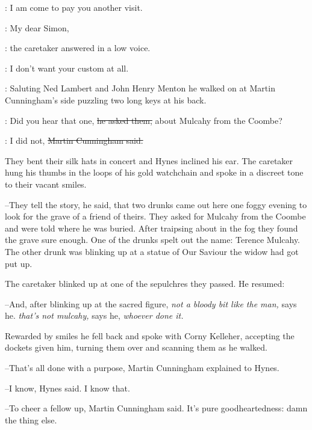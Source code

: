 \simon:
I am come to pay you another visit.

\oconnell:
My dear Simon,

:
the caretaker answered in a low voice.

\oconnell:
I don't want your custom at all.

:
Saluting Ned Lambert and John Henry Menton
he walked on at Martin Cunningham's side
puzzling two long keys at his back.

\oconnell:
Did you hear that one,
\sout{he asked them,}
about Mulcahy from the Coombe?

\cunningham:
I did not,
\sout{Martin Cunningham said.}

They bent their silk hats in concert and Hynes inclined his ear.
The caretaker hung his thumbs in the loops of his gold watchchain
and spoke in a discreet tone to their vacant smiles.

--They tell the story,
he said,
that two drunks came out here one foggy
evening to look for the grave of a friend of theirs.
They asked for Mulcahy from the Coombe and were told where he was buried.
After traipsing about in the fog they found the grave sure enough.
One of the drunks spelt out the name:
Terence Mulcahy.
The other drunk was blinking up at a statue of Our Saviour
the widow had got put up.

The caretaker blinked up at one of the sepulchres they passed.
He resumed:

--And, after blinking up at the sacred figure,
\emph{not a bloody bit like the man,} says he.
\emph{that's not mulcahy,} says he,
\emph{whoever done it.}

Rewarded by smiles
he fell back and spoke with Corny Kelleher,
accepting the dockets given him,
turning them over and scanning them as he walked.

--That's all done with a purpose,
Martin Cunningham explained to Hynes.

--I know, Hynes said.
I know that.

--To cheer a fellow up, Martin Cunningham said.
It's pure goodheartedness:
damn the thing else.


